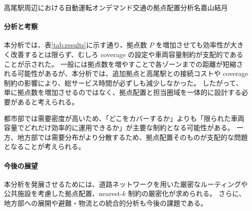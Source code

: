\begin{column}{高尾駅周辺における自動運転オンデマンド交通の拠点配置分析}{名嘉山結月}
\paragraph{分析と考察}
本分析では、表\ref{tab:results}に示す通り、拠点数 $P$ を増加させても効率性が大きく改善するとは限らず、むしろ coverage の設定や車両容量制約が支配的であることが示された。
一般には拠点数を増やすことで各ゾーンまでの距離が短縮される可能性があるが、本分析では、追加拠点と高尾駅との接続コストや coverage 制約の影響により、総サービス時間が必ずしも減少しなかった。
したがって、単に拠点数を増加させるのではなく、拠点配置と担当圏域を一体的に設計する必要があると考えられる。

都市部では需要密度が高いため、「どこをカバーするか」よりも「限られた車両容量でどれだけ効率的に運用できるか」が主要な制約となる可能性がある。
一方、地方部では需要分布がより分散するため、拠点配置そのものが支配的な問題となることが考えられる。

\paragraph{今後の展望}
本分析を発展させるためには、道路ネットワークを用いた厳密なルーティングや公共施設を考慮した拠点配置、nearest-$k$ 制約の厳密化が求められる。
さらに、地方部への展開や避難・物流との統合的分析も今後の課題である。
\end{column}
\clearpage
